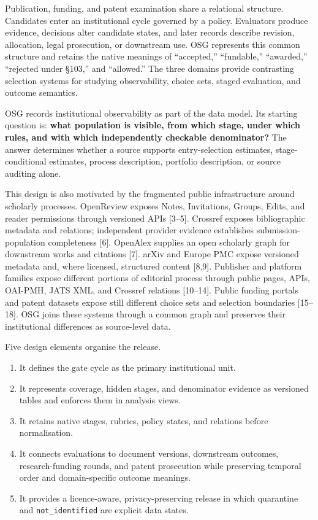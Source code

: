 \documentclass[
  10pt,
]{article}
\providecommand{\tightlist}{%
  \setlength{\itemsep}{0pt}\setlength{\parskip}{0pt}}
\begin{document}
Publication, funding, and patent examination share a relational
structure. Candidates enter an institutional cycle governed by a
policy. Evaluators produce evidence, decisions alter candidate states,
and later records describe revision, allocation, legal prosecution, or
downstream use. OSG represents this common structure and retains the
native meanings of ``accepted,'' ``fundable,'' ``awarded,'' ``rejected
under \S103,'' and ``allowed.'' The three domains provide contrasting
selection systems for studying observability, choice sets, staged
evaluation, and outcome semantics.

OSG records institutional observability as part of the data model. Its
starting question is: \textbf{what population is visible, from which
stage, under which rules, and with which independently checkable
denominator?} The answer determines whether a source supports
entry-selection estimates, stage-conditional estimates, process
description, portfolio description, or source auditing alone.

This design is also motivated by the fragmented public infrastructure
around scholarly processes. OpenReview exposes Notes, Invitations,
Groups, Edits, and reader permissions through versioned APIs {[}3--5{]}.
Crossref exposes bibliographic metadata and relations; independent
provider evidence establishes submission-population completeness
{[}6{]}. OpenAlex supplies an
open scholarly graph for downstream works and citations {[}7{]}. arXiv
and Europe PMC expose versioned metadata and, where licensed, structured
content {[}8,9{]}. Publisher and platform families expose different
portions of editorial process through public pages, APIs, OAI-PMH, JATS
XML, and Crossref relations {[}10--14{]}. Public funding portals and
patent datasets expose still different choice sets and selection
boundaries {[}15--18{]}. OSG joins these systems through a common graph
and preserves their institutional differences as source-level data.

Five design elements organise the release.

\begin{enumerate}
\def\labelenumi{\arabic{enumi}.}
\tightlist
\item
  It defines the gate cycle as the primary institutional unit.
\item
  It represents coverage, hidden stages, and denominator evidence as
  versioned tables and enforces them in analysis views.
\item
  It retains native stages, rubrics, policy states, and relations before
  normalisation.
\item
  It connects evaluations to document versions, downstream outcomes,
  research-funding rounds, and patent prosecution while preserving
  temporal order and domain-specific outcome meanings.
\item
  It provides a licence-aware, privacy-preserving release in which
  quarantine and \texttt{not\_identified} are explicit data states.
\end{enumerate}
\end{document}
